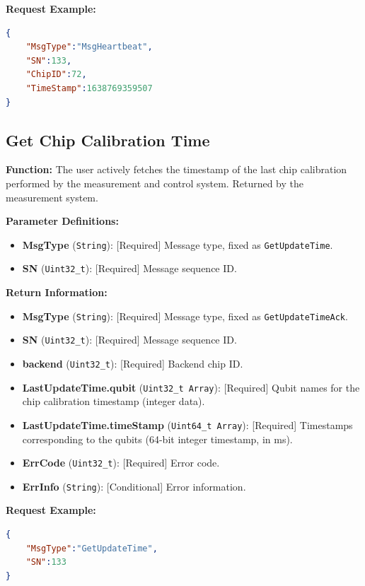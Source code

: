 \documentclass[12pt, a4paper]{article}
\begin{document}
\noindent \textbf{Request Example:}
\begin{lstlisting}[language=json]
{
    "MsgType":"MsgHeartbeat",
    "SN":133,
    "ChipID":72,
    "TimeStamp":1638769359507
}
\end{lstlisting}

\subsection{Get Chip Calibration Time}

\textbf{Function:} The user actively fetches the timestamp of the last chip calibration performed by the measurement and control system. Returned by the measurement system.

\textbf{Parameter Definitions:}
\begin{itemize}
    \item \textbf{MsgType} (\texttt{String}): [Required] Message type, fixed as \texttt{GetUpdateTime}.
    \item \textbf{SN} (\texttt{Uint32\_t}): [Required] Message sequence ID.
\end{itemize}

\textbf{Return Information:}
\begin{itemize}
    \item \textbf{MsgType} (\texttt{String}): [Required] Message type, fixed as \texttt{GetUpdateTimeAck}.
    \item \textbf{SN} (\texttt{Uint32\_t}): [Required] Message sequence ID.
    \item \textbf{backend} (\texttt{Uint32\_t}): [Required] Backend chip ID.
    \item \textbf{LastUpdateTime.qubit} (\texttt{Uint32\_t Array}): [Required] Qubit names for the chip calibration timestamp (integer data).
    \item \textbf{LastUpdateTime.timeStamp} (\texttt{Uint64\_t Array}): [Required] Timestamps corresponding to the qubits (64-bit integer timestamp, in ms).
    \item \textbf{ErrCode} (\texttt{Uint32\_t}): [Required] Error code.
    \item \textbf{ErrInfo} (\texttt{String}): [Conditional] Error information.
\end{itemize}

\noindent \textbf{Request Example:}
\begin{lstlisting}[language=json]
{
    "MsgType":"GetUpdateTime",
    "SN":133
}
\end{lstlisting}
\end{document}
